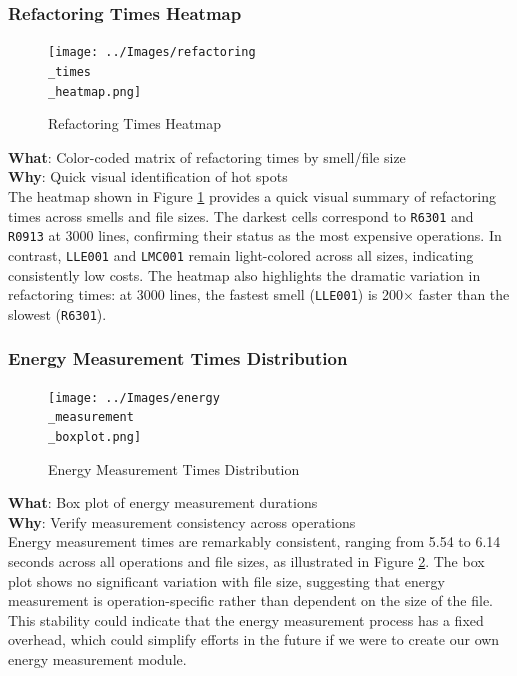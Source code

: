 \documentclass[12pt, titlepage]{article}
\begin{document}
\subsubsection{Refactoring Times Heatmap}
\begin{figure}[H]
  \centering
  \texttt{[image: ../Images/refactoring\\\_times\\\_heatmap.png]}
  \caption{Refactoring Times Heatmap}
  \label{fig:refactoring_heatmap}
\end{figure}

\noindent \textbf{What}: Color-coded matrix of refactoring times by
smell/file size\\

\noindent \textbf{Why}: Quick visual identification of hot spots\\

The heatmap shown in Figure \ref{fig:refactoring_heatmap} provides a quick visual summary of refactoring times
across smells and file sizes. The darkest cells correspond to
\texttt{R6301} and \texttt{R0913} at 3000 lines, confirming their
status as the most expensive operations. In contrast, \texttt{LLE001}
and \texttt{LMC001} remain light-colored across all sizes, indicating
consistently low costs. The heatmap also highlights the dramatic
variation in refactoring times: at 3000 lines, the fastest smell
(\texttt{LLE001}) is 200× faster than the slowest (\texttt{R6301}).

\subsubsection{Energy Measurement Times Distribution}
\begin{figure}[H]
  \centering
  \texttt{[image: ../Images/energy\\\_measurement\\\_boxplot.png]}
  \caption{Energy Measurement Times Distribution}
  \label{fig:energy_boxplot}
\end{figure}

\noindent \textbf{What}: Box plot of energy measurement durations\\

\noindent \textbf{Why}: Verify measurement consistency across operations\\

Energy measurement times are remarkably consistent, ranging from 5.54
to 6.14 seconds across all operations and file sizes, as illustrated in Figure \ref{fig:energy_boxplot}.
The box plot shows no significant variation with file size,
suggesting that energy measurement is operation-specific
rather than dependent on the size of the file. This stability could
indicate that the energy measurement process has a fixed
overhead, which could simplify efforts in the future if we were to
create our own energy measurement module.
\end{document}
